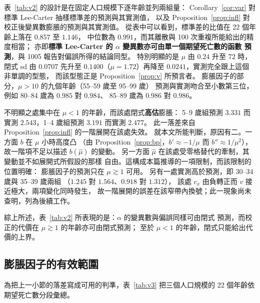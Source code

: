 \documentclass[UTF8, fontset=macnew, a4paper, 12pt]{ctexart}
\begin{document}
表~\ref{tab:v2} 的設計是在固定人口規模下逐年齡並列兩組量：
Corollary~\ref{cor:var} 對標準 Lee-Carter 抽樣標準差的預測與其實測值，
以及 Proposition~\ref{prop:infl} 對校正後變異數膨脹的預測與其實測值。
從表中可以看到，標準差的比值在 22 個年齡上落在 $0.857$ 至 $1.146$，
中位數為 $0.991$，而其離散與 100 次重複所能給出的精度相當；
亦即\textbf{標準 Lee-Carter 的 $\alpha$ 變異數亦可由單一個期望死亡數的函數
預測}，與 1005 報告對偏誤所得的結論同型。
特別明顯的是 $\mu$ 由 $0.24$ 升至 $72$ 時，閉式 sd 由 $0.0707$ 先升至
$0.1400$（$\mu=1.72$）再降至 $0.0241$，實測完全跟上這個非單調的型態，
而該型態正是 Proposition~\ref{prop:v} 所預言者。
膨脹因子的部分，$\mu>10$ 的九個年齡（55--59 歲至 95--99 歲）
預測與實測吻合至小數第三位，例如 80--84 歲為 $0.985$ 對 $0.984$、
85--89 歲為 $0.986$ 對 $0.986$。

不明顯之處集中在 $\mu<1$ 的年齡，而該處閉式\textbf{高估}膨脹：
5--9 歲組預測 $3.331$ 而實測 $2.543$，1--4 歲組預測 $3.191$ 而實測 $2.477$。
此一落差來自 Proposition~\ref{prop:infl} 的一階展開在該處失效。
就本文所能判斷，原因有二。一方面 $b$ 在 $\mu$ 小時高度凸
（由 Proposition~\ref{prop:bp}，$b'\approx-1/\mu$ 而 $b''\approx1/\mu^2$），
故一階項不足以描述 $b(\hat\mu)$ 的變動。
另一方面 $\hat\mu$ 在該處受零格替代的牽制，其變動並不如展開式所假設的那樣
自由。這構成本篇推導的一項限制，而該限制的位置明確：
膨脹因子的預測只在 $\mu\gtrsim1$ 可用。
另有一處實測高於預測，即 30--34 歲與 35--39 歲兩組
（$1.245$ 對 $1.564$、$0.918$ 對 $1.312$），
該處 $c_x$ 由負轉正而 $v$ 接近極大，兩項變化同時發生，
故一階展開的誤差在該窄帶內換號；此一現象尚未查明，列為後續工作。

綜上所述，表~\ref{tab:v2} 所表現的是：$\alpha$ 的變異數與偏誤同樣可由閉式
預測，而校正的代價在 $\mu\gtrsim1$ 的年齡亦可由閉式預測；
至於 $\mu<1$ 的年齡，閉式只能給出代價的上界。

\subsection{膨脹因子的有效範圍}

為把上一小節的落差寫成可用的判準，表~\ref{tab:v3} 把三個人口規模的
22 個年齡依期望死亡數分段彙總。
\end{document}
